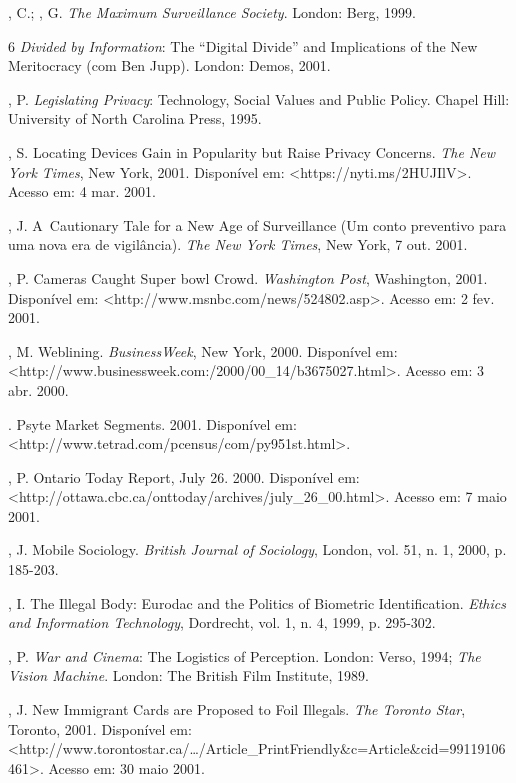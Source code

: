 \begin{Parskip}
, C.; , G. \emph{The Maximum Surveillance Society}.
London: Berg, 1999.

 6 \emph{Divided by Information}: The ``Digital Divide'' and
Implications of the New Meritocracy (com Ben Jupp). London: Demos, 2001.

, P. \emph{Legislating Privacy}: Technology, Social Values and
Public Policy. Chapel Hill: University of North Carolina Press, 1995.

, S. Locating Devices Gain in Popularity but Raise Privacy
Concerns. \emph{The New York Times}, New York, 2001. Disponível em:
\textless{}https://nyti.ms/2HUJIlV\textgreater{}.
Acesso em: 4 mar. 2001.

, J. A~Cautionary Tale for a New Age of Surveillance (Um conto
preventivo para uma nova era de vigilância). \emph{The New York Times},
New York, 7 out. 2001.

, P. Cameras Caught Super bowl Crowd. \emph{Washington Post},
Washington, 2001. Disponível em:
\textless{}http://www.msnbc.com/news/524802.asp\textgreater{}. Acesso
em: 2 fev. 2001.%

, M. Weblining. \emph{BusinessWeek}, New York, 2000. Disponível
em:
\textless{}http://www.businessweek.com:/2000/00\_14/b3675027.html\textgreater{}.
Acesso em: 3 abr. 2000. %

 . Psyte Market Segments. 2001. Disponível em:
\textless{}http://www.tetrad.com/pcensus/com/py951st.html\textgreater{}. %

, P. Ontario Today Report, July 26. 2000. Disponível em:
\textless{}http://ottawa.cbc.ca/onttoday/archives/july\_26\_00.html\textgreater{}.
Acesso em: 7 maio 2001. %

, J. Mobile Sociology. \emph{British Journal of Sociology}, London,
vol. 51, n. 1, 2000, p. 185-203.

  , I. The Illegal Body: Eurodac and the Politics of
Biometric Identification. \emph{Ethics and Information Technology},
Dordrecht, vol. 1, n. 4, 1999, p. 295-302.

, P. \emph{War and Cinema}: The Logistics of Perception. London:
Verso, 1994; \emph{The Vision Machine}. London: The British Film
Institute, 1989.

, J. New Immigrant  Cards are Proposed to Foil Illegals.
\emph{The Toronto Star}, Toronto, 2001. Disponível em:
\textless{}http://www.torontostar.ca/\ldots{}/Article\_PrintFriendly\&c=Article\&cid=99119106461\textgreater{}. %
Acesso em: 30 maio 2001.
\end{Parskip}

